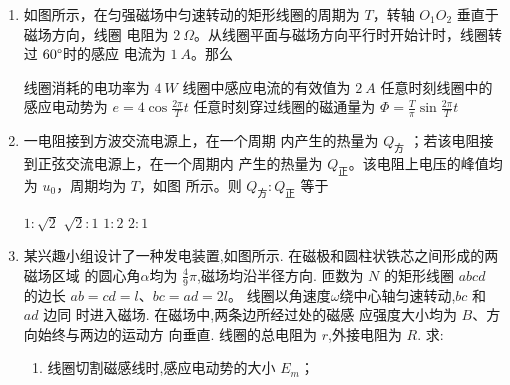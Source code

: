 \begin{enumerate}
\item
{}
如图所示，在匀强磁场中匀速转动的矩形线圈的周期为 $ T $，转轴 $ O_{1} O_{2} $ 垂直于磁场方向，线圈
电阻为 $ 2 \ \Omega $。从线圈平面与磁场方向平行时开始计时，线圈转过 $ 60 \degree $时的感应
电流为 $ 1 \ A $。那么  
\begin{figure}[h!]
\centering

\end{figure}


\fourchoices
{线圈消耗的电功率为 $ 4 \ W $}
{线圈中感应电流的有效值为 $ 2 \ A $}
{任意时刻线圈中的感应电动势为 $e=4 \cos \frac{2 \pi}{T} t$}
{任意时刻穿过线圈的磁通量为 $\Phi=\frac{T}{\pi} \sin \frac{2 \pi}{T} t$}



\item 
{}
一电阻接到方波交流电源上，在一个周期
内产生的热量为 $ Q_{ \text{方} } $ ；若该电阻接到正弦交流电源上，在一个周期内
产生的热量为 $ Q_{ \text{正} } $。该电阻上电压的峰值均为 $ u_{0} $，周期均为 $ T $，如图
所示。则 $ Q _{ \text{方} } :Q_{ \text{正} } $ 等于  
\begin{figure}[h!]
\centering
\begin{subfigure}{0.4\linewidth}
\centering
 
\caption{}\label{}
\end{subfigure}
\begin{subfigure}{0.4\linewidth}
\centering
 
\caption{}\label{}
\end{subfigure}
\end{figure}



\fourchoices
{$ 1:\sqrt{2} $}
{$ \sqrt{2}:1 $}
{$ 1:2 $}
{$ 2:1 $}


\item 
{}
某兴趣小组设计了一种发电装置,如图所示. 在磁极和圆柱状铁芯之间形成的两磁场区域
的圆心角$ \alpha $均为
$ \frac{ 4 }{ 9 } \pi $,磁场均沿半径方向. 匝数为
$ N $ 的矩形线圈 $ abcd $ 的边长 $ ab=cd=l $、$ bc=ad=2l $。
线圈以角速度$ \omega $绕中心轴匀速转动,$ bc $ 和 $ ad $ 边同
时进入磁场. 在磁场中,两条边所经过处的磁感
应强度大小均为 $ B $、方向始终与两边的运动方
向垂直. 线圈的总电阻为 $ r $,外接电阻为 $ R $. 求:
\begin{enumerate}
\item
线圈切割磁感线时,感应电动势的大小 $ E_{m} $；


\end{enumerate}
\end{enumerate}
